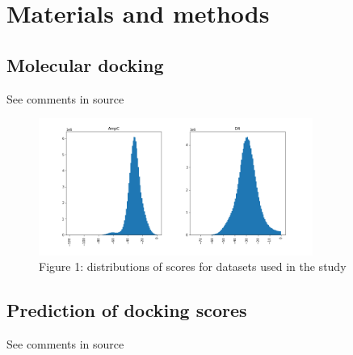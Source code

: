 \section{Materials and methods}

\subsection{Molecular docking}
See comments in source

\begin{figure}[h]
\centering
\includegraphics[width=0.8\textwidth]{figures/Figure_1.png}
\caption{Figure 1: distributions of scores for datasets used in the study}
\end{figure}


\subsection{Prediction of docking scores} \label{subsec:prediction}
See comments in source



